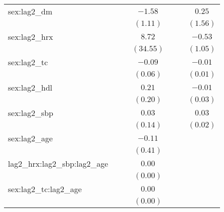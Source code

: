 \begin{tabular}{l c c c c c c}
sex:lag2\_dm                      &              &            & $-1.58$    &                &                & $0.25$         \\
                                  &              &            & $(1.11)$   &                &                & $(1.56)$       \\
sex:lag2\_hrx                     &              &            & $8.72$     &                &                & $-0.53$        \\
                                  &              &            & $(34.55)$  &                &                & $(1.05)$       \\
sex:lag2\_tc                      &              &            & $-0.09$    &                &                & $-0.01$        \\
                                  &              &            & $(0.06)$   &                &                & $(0.01)$       \\
sex:lag2\_hdl                     &              &            & $0.21$     &                &                & $-0.01$        \\
                                  &              &            & $(0.20)$   &                &                & $(0.03)$       \\
sex:lag2\_sbp                     &              &            & $0.03$     &                &                & $0.03$         \\
                                  &              &            & $(0.14)$   &                &                & $(0.02)$       \\
sex:lag2\_age                     &              &            & $-0.11$    &                &                &                \\
                                  &              &            & $(0.41)$   &                &                &                \\
lag2\_hrx:lag2\_sbp:lag2\_age     &              &            & $0.00$     &                &                &                \\
                                  &              &            & $(0.00)$   &                &                &                \\
sex:lag2\_tc:lag2\_age            &              &            & $0.00$     &                &                &                \\
                                  &              &            & $(0.00)$   &                &                &                \\

\end{tabular}
